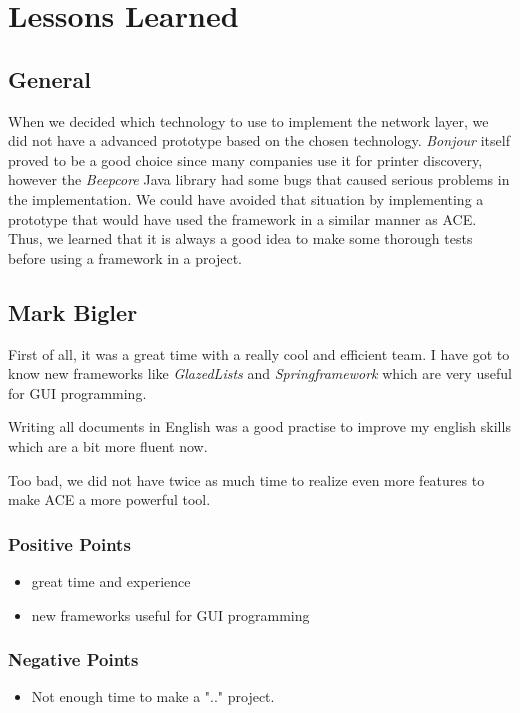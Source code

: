 \chapter{Lessons Learned}
\label{chapter:lessonslearned}



\section{General}
When we decided which technology to use to implement the network layer, we did
not have a advanced prototype based on the chosen technology. \emph{Bonjour}
itself proved to be a good choice since many companies use it for printer discovery, however the \emph{Beepcore} Java library had some bugs that caused serious problems in the implementation. We could have avoided that situation by implementing a prototype that would have used
the framework in a similar manner as ACE. Thus, we learned that it is always a good idea to make some thorough tests before using a framework in a project.



\section{Mark Bigler}
First of all, it was a great time with a really cool and efficient team. I have got to know new frameworks like \textit{GlazedLists} and \textit{Springframework} which are very useful for GUI programming.

Writing all documents in English was a good practise to improve my english skills which are a bit more fluent now.

Too bad, we did not have twice as much time to realize even more features to make ACE a more powerful tool.
\subsection{Positive Points}
\begin{itemize}
\item great time and experience
\item new frameworks useful for GUI programming
\end{itemize}

\subsection{Negative Points}
\begin{itemize}
\item Not enough time to make a ".." project.
\end{itemize}



